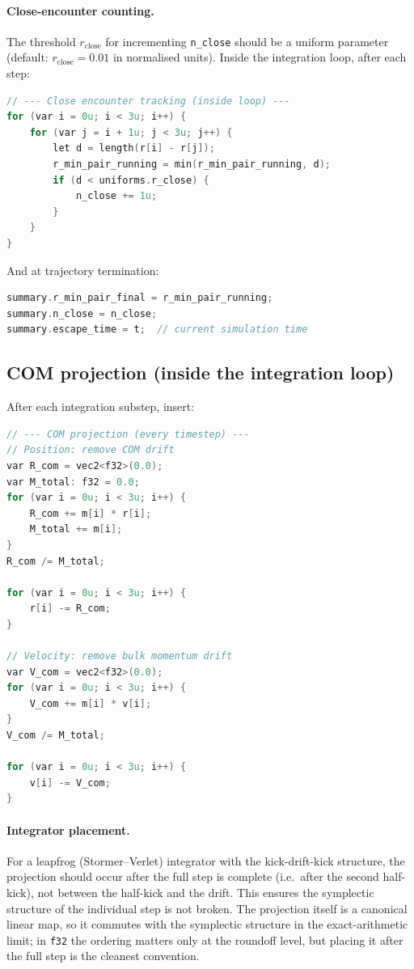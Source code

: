 \documentclass[11pt]{article}
\newcommand{\field}[1]{\texttt{#1}}
\begin{document}
\paragraph{Close-encounter counting.} The threshold $r_{\text{close}}$ for
incrementing \field{n\_close} should be a uniform parameter (default:
$r_{\text{close}} = 0.01$ in normalised units). Inside the integration loop,
after each step:

\begin{lstlisting}[language=C]
// --- Close encounter tracking (inside loop) ---
for (var i = 0u; i < 3u; i++) {
    for (var j = i + 1u; j < 3u; j++) {
        let d = length(r[i] - r[j]);
        r_min_pair_running = min(r_min_pair_running, d);
        if (d < uniforms.r_close) {
            n_close += 1u;
        }
    }
}
\end{lstlisting}

And at trajectory termination:
\begin{lstlisting}[language=C]
summary.r_min_pair_final = r_min_pair_running;
summary.n_close = n_close;
summary.escape_time = t;  // current simulation time
\end{lstlisting}

\subsection{COM projection (inside the integration loop)}

After each integration substep, insert:

\begin{lstlisting}[language=C]
// --- COM projection (every timestep) ---
// Position: remove COM drift
var R_com = vec2<f32>(0.0);
var M_total: f32 = 0.0;
for (var i = 0u; i < 3u; i++) {
    R_com += m[i] * r[i];
    M_total += m[i];
}
R_com /= M_total;

for (var i = 0u; i < 3u; i++) {
    r[i] -= R_com;
}

// Velocity: remove bulk momentum drift
var V_com = vec2<f32>(0.0);
for (var i = 0u; i < 3u; i++) {
    V_com += m[i] * v[i];
}
V_com /= M_total;

for (var i = 0u; i < 3u; i++) {
    v[i] -= V_com;
}
\end{lstlisting}

\paragraph{Integrator placement.} For a leapfrog (Stormer--Verlet) integrator
with the kick-drift-kick structure, the projection should occur after the full
step is complete (i.e.\ after the second half-kick), not between the half-kick
and the drift. This ensures the symplectic structure of the individual step is
not broken. The projection itself is a canonical linear map, so it commutes with
the symplectic structure in the exact-arithmetic limit; in \texttt{f32} the
ordering matters only at the roundoff level, but placing it after the full step
is the cleanest convention.
\end{document}
